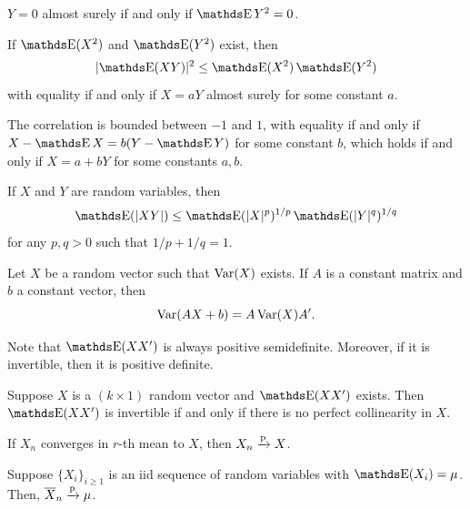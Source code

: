 \begin{lemma}
  \(Y = 0\) almost surely if and only if \(\E Y^2 = 0\).
\end{lemma}

\begin{theorem}
  If \(\E(X^2)\) and  \(\E(Y^2)\) exist, then
  \[
    \abs{\E(XY)}^2 \leq \E(X^2) \E(Y^2)
  \]
  with equality if and only if \(X = aY\) almost surely for some constant \(a\).
\end{theorem}

\begin{corollary}
  The correlation is bounded between \(-1\) and \(1\), with equality if and only if \(X - \E X = b(Y - \E Y)\) for some constant \(b\), which holds if and only if \(X = a + bY\) for some constants \(a, b\).
\end{corollary}

\begin{theorem}
  If \(X\) and \(Y\) are random variables, then
  \[
    \E(\abs{XY}) \leq \E(\abs{X}^p)^{1/p} \E(\abs{Y}^q)^{1/q}
  \]
  for any \(p, q > 0\) such that \(1/p + 1/q = 1\).
\end{theorem}

\begin{proposition}
  Let \(X\) be a random vector such that \(\operatorname{Var}(X)\) exists.
  If \(A\) is a constant matrix and \(b\) a constant vector, then
  \[
    \operatorname{Var}(AX + b)
    = A \operatorname{Var}(X) A'.
  \]
\end{proposition}

\begin{proposition}
  Note that \(\E(XX')\) is always positive semidefinite.
  Moreover, if it is invertible, then it is positive definite.
\end{proposition}

\begin{proposition}
  Suppose \(X\) is a \((k \times 1)\) random vector and \(\E(XX')\) exists.
  Then \(\E(XX')\) is invertible if and only if there is no perfect collinearity in \(X\).
\end{proposition}

\begin{proposition}
  If \(X_n\) converges in \(r\)-th mean to  \(X\), then \(X_n \xrightarrow{\mathrm{p}} X\).
\end{proposition}

\begin{theorem}
  Suppose \(\{X_i\}_{i \geq 1}\) is an iid sequence of random variables with \(\E(X_i) = \mu\).
  Then, \(\overline{X}_n \xrightarrow{\mathrm{p}} \mu\).
\end{theorem}

